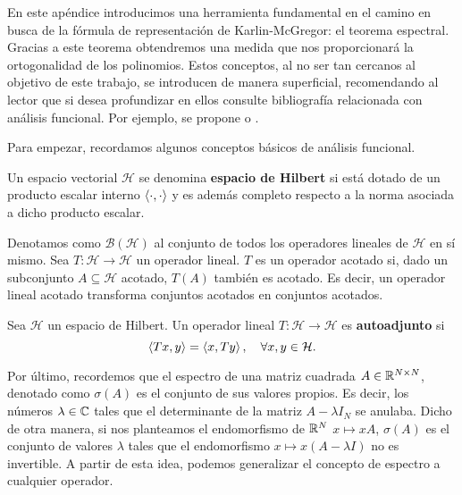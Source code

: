 
    
    En este apéndice introducimos una herramienta fundamental en el camino en busca de la fórmula de representación de Karlin-McGregor: el teorema espectral. Gracias a este teorema obtendremos una medida que nos proporcionará la ortogonalidad de los polinomios. Estos conceptos, al no ser tan cercanos al objetivo de este trabajo, se introducen de manera superficial, recomendando al lector que si desea profundizar en ellos consulte bibliografía relacionada con análisis funcional. Por ejemplo, se propone \cite[Ch. 1]{Manuel} o \cite[Ch. 12]{rudin}.

    Para empezar, recordamos algunos conceptos básicos de análisis funcional.

    \begin{definicion}
        Un espacio vectorial $\mathcal{H}$ se denomina \textbf{espacio de Hilbert} si está dotado de un producto escalar interno $\left\langle \cdot , \cdot \right\rangle$ y es además completo respecto a la norma asociada a dicho producto escalar.
    \end{definicion}

    Denotamos como $\mathcal{B}(\mathcal{H})$ al conjunto de todos los operadores lineales de $\mathcal{H}$ en sí mismo. Sea $T:\mathcal H \longrightarrow \mathcal{H}$ un operador lineal. $T$ es un operador acotado si, dado un subconjunto $A\subseteq \mathcal{H}$ acotado, $T(A)$ también es acotado. Es decir, un operador lineal acotado transforma conjuntos acotados en conjuntos acotados. 


    \begin{definicion}
        Sea $\mathcal{H}$ un espacio de Hilbert. Un operador lineal $T:\mathcal H \longrightarrow \mathcal{H}$ es \textbf{autoadjunto} si
        \begin{equation}
            \label{eq:operador-autoadjunto}
            \left\langle Tx , y \right\rangle = \left\langle x , Ty \right\rangle, \ \ \ \forall x,y\in \mathcal H.
        \end{equation}
    \end{definicion}

    Por último, recordemos que el espectro de una matriz cuadrada $A\in\mathbb{R}^{N\times N}$, denotado como $\sigma(A)$ es el conjunto de sus valores propios. Es decir, los números $\lambda\in\mathbb{C}$ tales que el determinante de la matriz $A-\lambda I_N$ se anulaba. Dicho de otra manera, si nos planteamos el endomorfismo de $\mathbb{R}^N$ $x\mapsto xA$, $\sigma(A)$ es el conjunto de valores $\lambda$ tales que el endomorfismo $x\mapsto x(A-\lambda I)$ no es invertible. A partir de esta idea, podemos generalizar el concepto de espectro a cualquier operador.
    
